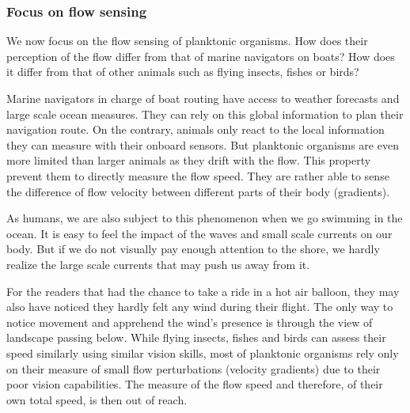 \subsubsection{Focus on flow sensing}\label{sec:intro_flow_sensing}

We now focus on the flow sensing of planktonic organisms. 
How does their perception of the flow differ from that of marine navigators on boats?
How does it differ from that of other animals such as flying insects, fishes or birds?

Marine navigators in charge of boat routing have access to weather forecasts and large scale ocean measures.
They can rely on this global information to plan their navigation route.
On the contrary, animals only react to the local information they can measure with their onboard sensors.
But planktonic organisms are even more limited than larger animals as they drift with the flow.
This property prevent them to directly measure the flow speed.
They are rather able to sense the difference of flow velocity between different parts of their body (gradients).

As humans, we are also subject to this phenomenon when we go swimming in the ocean.
It is easy to feel the impact of the waves and small scale currents on our body.
But if we do not visually pay enough attention to the shore, we hardly realize the large scale currents that may push us away from it.

For the readers that had the chance to take a ride in a hot air balloon, they may also have noticed they hardly felt any wind during their flight.
The only way to notice movement and apprehend the wind's presence is through the view of landscape passing below.
While flying insects, fishes and birds can assess their speed similarly using similar vision skills, most of planktonic organisms rely only on their measure of small flow perturbations (velocity gradients) due to their poor vision capabilities.
The measure of the flow speed and therefore, of their own total speed, is then out of reach.

